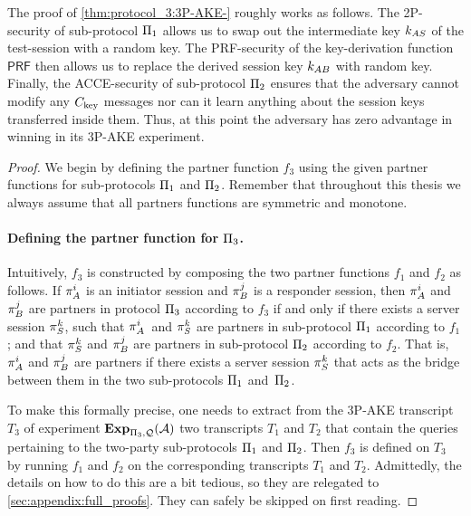 The proof of \cref{thm:protocol_3:3P-AKE-} roughly works as follows.
The 2P-\akefstext security of sub-protocol $\mathrm{\Pi}_1$ allows us to swap out the intermediate key $k_{AS}$ of the test-session with a random key.
The PRF-security of the key-derivation function $\mathsf{PRF}$ then allows us to replace the derived session key $k_{AB}$ with random key.
Finally, the ACCE-security of sub-protocol $\mathrm{\Pi}_2$ ensures that the adversary cannot modify any $C_{\mathrm{key}}$ messages
nor can it learn anything about the session keys transferred inside them.
Thus,
at this point the adversary has zero advantage in winning in its 3P-AKE experiment.



\begin{proof}
We begin by defining the partner function $f_3$ using the given partner functions for sub-protocols $\mathrm{\Pi}_1$ and $\mathrm{\Pi}_2$.
Remember that throughout this thesis we always assume that all partners functions are symmetric and monotone.

\item
\paragraph{Defining the partner function for \texorpdfstring{$\mathrm{\Pi}_3$}{Pi 3}.}
Intuitively,
$f_3$ is constructed by composing the two partner functions $f_1$ and $f_2$ as follows.
If $\oracle[A][i]$ is an initiator session and $\oracle[B][j]$ is a responder session,
then $\oracle[A][i]$ and  $\oracle[B][j]$ are partners in protocol $\mathrm{\Pi}_3$ according to $f_3$ if and only if there exists a server session $\oracle[S][k]$,
such that $\oracle[A][i]$~and $\oracle[S][k]$ are partners in sub-protocol $\mathrm{\Pi}_1$ according to $f_1$;
and  that $\oracle[S][k]$ and $\oracle[B][j]$ are partners in sub-protocol $\mathrm{\Pi}_2$ according to $f_2$.
That is,
$\oracle[A][i]$ and $\oracle[B][j]$ are partners if there exists a server session $\oracle[S][k]$ that acts as the bridge between them in the two sub-protocols $\mathrm{\Pi}_1$ and~$\mathrm{\Pi}_2$.


To make this formally precise,
one needs to extract from the 3P-AKE transcript $T_3$ of experiment $\mathbf{Exp}_{\mathrm{\Pi}_3,\mathcal{Q}}(\mathcal{A})$
two transcripts $T_1$ and $T_2$ that contain the queries pertaining to the two-party sub-protocols $\mathrm{\Pi}_1$ and $\mathrm{\Pi}_2$.
Then $f_3$ is defined on $T_3$ by running $f_1$ and $f_2$ on the corresponding transcripts $T_1$ and $T_2$.
Admittedly,
the details on how to do this are a bit tedious,
so they are relegated to \cref{sec:appendix:full_proofs}.
They can safely be skipped on first reading.



\end{proof}
